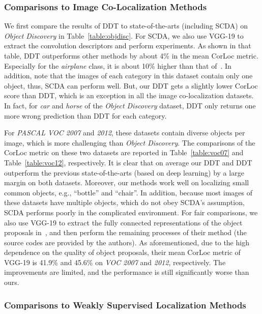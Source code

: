 \documentclass[twocolumn]{svjour3}          \smartqed  \usepackage{graphicx}
\begin{document}
\subsubsection{Comparisons to Image Co-Localization Methods}

We first compare the results of DDT to state-of-the-arts (including SCDA) on \emph{Object Discovery} in Table~\ref{table:objdisc}. For SCDA, we also use VGG-19 to extract the convolution descriptors and perform experiments. As shown in that table, DDT outperforms other methods by about 4\% in the mean CorLoc metric. Especially for the \emph{airplane} class, it is about 10\% higher than that of~\citet{chicvpr2015}. In addition, note that the images of each category in this dataset contain only one object, thus, SCDA can perform well. But, our DDT gets a slightly lower CorLoc score than DDT, which is an exception in all the image co-localization datasets. In fact, for \emph{car} and \emph{horse} of the \emph{Object Discovery} dataset, DDT only returns one more wrong prediction than DDT for each category.

For \emph{PASCAL VOC 2007} and \emph{2012}, these datasets contain diverse objects per image, which is more challenging than \emph{Object Discovery}. The comparisons of the CorLoc metric on these two datasets are reported in Table~\ref{table:voc07} and Table~\ref{table:voc12}, respectively. It is clear that on average our DDT and DDT outperform the previous state-of-the-arts (based on deep learning) by a large margin on both datasets. Moreover, our methods work well on localizing small common objects, e.g., ``bottle'' and ``chair''. In addition, because most images of these datasets have multiple objects, which do not obey SCDA's assumption, SCDA performs poorly in the complicated environment. For fair comparisons, we also use VGG-19 to extract the fully connected representations of the object proposals in~\citep{yaoeccv2016}, and then perform the remaining processes of their method (the source codes are provided by the authors). As aforementioned, due to the high dependence on the quality of object proposals, their mean CorLoc metric of VGG-19 is 41.9\% and 45.6\% on \emph{VOC 2007} and \emph{2012}, respectively. The improvements are limited, and the performance is still significantly worse than ours.

\subsubsection{Comparisons to Weakly Supervised Localization Methods}
\end{document}
